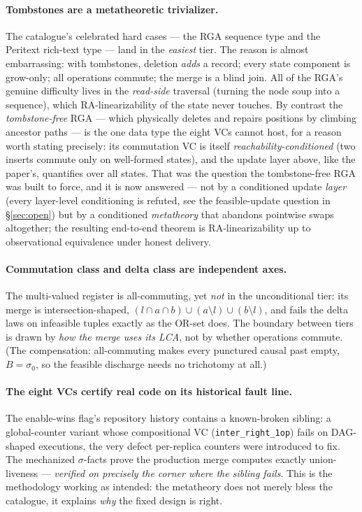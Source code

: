 \documentclass[11pt]{article}
\newcommand{\Sinit}{\sigma_0}
\newcommand{\lean}[1]{\texttt{#1}}
\begin{document}
\paragraph{Tombstones are a metatheoretic trivializer.} The catalogue's
celebrated hard cases --- the RGA sequence type and the Peritext
rich-text type --- land in the \emph{easiest} tier. The reason is almost
embarrassing: with tombstones, deletion \emph{adds} a record; every state
component is grow-only; all operations commute; the merge is a blind
join. All of the RGA's genuine difficulty lives in the \emph{read-side}
traversal (turning the node soup into a sequence), which
RA-linearizability of the state never touches. By contrast the
\emph{tombstone-free} RGA --- which physically deletes and repairs
positions by climbing ancestor paths --- is the one data type the eight
VCs cannot host, for a reason worth stating precisely: its commutation VC
is itself \emph{reachability-conditioned} (two inserts commute only on
well-formed states), and the update layer above, like the paper's,
quantifies over all states. That was the question the tombstone-free RGA
was built to force, and it is now answered --- not by a conditioned
update \emph{layer} (every layer-level conditioning is refuted, see the
feasible-update question in \S\ref{sec:open}) but by a conditioned
\emph{metatheory} that abandons pointwise swaps altogether; the resulting
end-to-end theorem is RA-linearizability up to observational equivalence
under honest delivery.

\paragraph{Commutation class and delta class are independent axes.} The
multi-valued register is all-commuting, yet \emph{not} in the
unconditional tier: its merge is intersection-shaped,
$(l \cap a \cap b) \cup (a \setminus l) \cup (b \setminus l)$, and fails
the delta laws on infeasible tuples exactly as the OR-set does. The
boundary between tiers is drawn by \emph{how the merge uses its LCA}, not
by whether operations commute. (The compensation: all-commuting makes
every punctured causal past empty, $B = \Sinit$, so the feasible
discharge needs no trichotomy at all.)

\paragraph{The eight VCs certify real code on its historical fault
line.} The enable-wins flag's repository history contains a
known-broken sibling: a global-counter variant whose compositional VC
(\lean{inter\_right\_1op}) fails on DAG-shaped executions, the very defect
per-replica counters were introduced to fix. The mechanized $\sigma$-facts
prove the production merge computes exactly union-liveness ---
\emph{verified on precisely the corner where the sibling fails}. This is
the methodology working as intended: the metatheory does not merely bless
the catalogue, it explains \emph{why} the fixed design is right.
\end{document}
